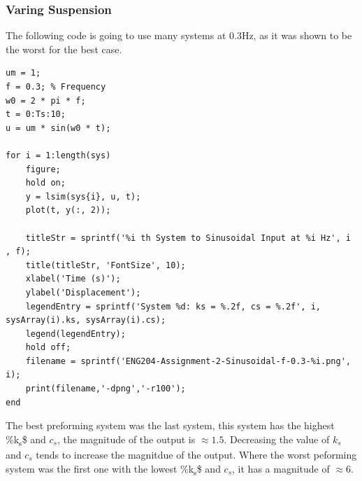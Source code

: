 \documentclass[11pt]{article}
\begin{document}
\subsubsection{Varing Suspension}
\label{sec:org70c3b0a}
The following code is going to use many systems at 0.3Hz, as it was shown to be the worst for the best case.
\begin{verbatim}
um = 1;
f = 0.3; % Frequency
w0 = 2 * pi * f;
t = 0:Ts:10;
u = um * sin(w0 * t);

for i = 1:length(sys)
    figure;
    hold on;
    y = lsim(sys{i}, u, t);
    plot(t, y(:, 2));

    titleStr = sprintf('%i th System to Sinusoidal Input at %i Hz', i , f);
    title(titleStr, 'FontSize', 10);
    xlabel('Time (s)');
    ylabel('Displacement');
    legendEntry = sprintf('System %d: ks = %.2f, cs = %.2f', i, sysArray(i).ks, sysArray(i).cs);
    legend(legendEntry);
    hold off;
    filename = sprintf('ENG204-Assignment-2-Sinusoidal-f-0.3-%i.png', i);
    print(filename,'-dpng','-r100');
end
\end{verbatim}

The best preforming system was the last system, this system has the highest \%k\textsubscript{s}\$ and \(c_s\), the magnitude of the output is \(\approx 1.5\). Decreasing the value of \(k_s\) and \(c_s\) tends to increase the magnitdue of the output. Where the worst peforming system was the first one with the lowest \%k\textsubscript{s}\$ and \(c_s\), it has a magnitude of \(\approx 6\).
\end{document}
